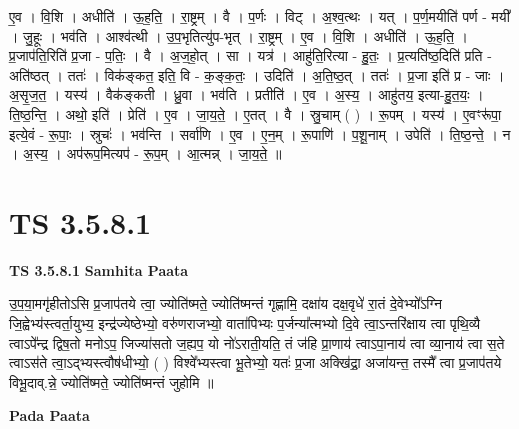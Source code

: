 \documentclass[17pt]{extarticle}
\begin{document}
ए॒व । वि॒शि । अधीति॑ । ऊ॒ह॒ति॒ । रा॒ष्ट्रम् । वै । प॒र्णः । विट् । अ॒श्व॒त्थः । यत् । प॒र्ण॒मयीति॑ पर्ण - मयी᳚ । जु॒हूः । भव॑ति । आश्व॑त्थी । उ॒प॒भृतित्यु॑प-भृत् । रा॒ष्ट्रम् । ए॒व । वि॒शि । अधीति॑ । ऊ॒ह॒ति॒ । प्र॒जाप॑ति॒रिति॑ प्र॒जा - प॒तिः॒ । वै । अ॒ज॒हो॒त् । सा । यत्र॑ । आहु॑ति॒रित्या - हु॒तः॒ । प्र॒त्यति॑ष्ठ॒दिति॑ प्रति - अति॑ष्ठत् । ततः॑ । विक॑ङ्कत॒ इति॒ वि - क॒ङ्क॒तः॒ । उदिति॑ । अ॒ति॒ष्ठ॒त् । ततः॑ । प्र॒जा इति॑ प्र - जाः । अ॒सृ॒ज॒त॒ । यस्य॑ । वैक॑ङ्कती । ध्रु॒वा । भव॑ति । प्रतीति॑ । ए॒व । अ॒स्य॒ । आहु॑तय॒ इत्या-हु॒त॒यः॒ । ति॒ष्ठ॒न्ति॒ । अथो॒ इति॑ । प्रेति॑ । ए॒व । जा॒य॒ते॒ । ए॒तत् । वै । स्रु॒चाम् ( ) । रू॒पम् । यस्य॑ । ए॒वꣳरू॑पा॒ इत्ये॒वं - रू॒पाः॒ । स्रुचः॑ । भव॑न्ति । सर्वा॑णि । ए॒व । ए॒न॒म् । रू॒पाणि॑ । प॒शू॒नाम् । उपेति॑ । ति॒ष्ठ॒न्ते॒ । न । अ॒स्य॒ । अप॑रूप॒मित्यप॑ - रू॒प॒म् । आ॒त्मन्न् । जा॒य॒ते॒ ॥  \newline





\section{ TS 3.5.8.1 }

\textbf{TS 3.5.8.1 } \newline
\textbf{Samhita Paata} \newline

उ॒प॒या॒मगृ॑हीतोऽसि प्र॒जाप॑तये त्वा॒ ज्योति॑ष्मते॒ ज्योति॑ष्मन्तं गृह्णामि॒ दक्षा॑य दक्ष॒वृधे॑ रा॒तं दे॒वेभ्यो᳚ऽग्नि जि॒ह्वेभ्य॑स्त्वर्ता॒युभ्य॒ इन्द्र॑ज्येष्ठेभ्यो॒ वरु॑णराजभ्यो॒ वाता॑पिभ्यः प॒र्जन्या᳚त्मभ्यो दि॒वे त्वा॒ऽन्तरि॑क्षाय त्वा पृथि॒व्यै त्वाऽपे᳚न्द्र द्विष॒तो मनोऽप॒ जिज्या॑सतो ज॒ह्यप॒ यो नो॑ऽराती॒यति॒ तं ज॑हि प्रा॒णाय॑ त्वाऽपा॒नाय॑ त्वा व्या॒नाय॑ त्वा स॒ते त्वाऽस॑ते त्वा॒ऽद्भ्यस्त्वौष॑धीभ्यो॒ ( ) विश्वे᳚भ्यस्त्वा भू॒तेभ्यो॒ यतः॑ प्र॒जा अक्खि॑द्रा॒ अजा॑यन्त॒ तस्मै᳚ त्वा प्र॒जाप॑तये विभू॒दाव्.न्ने॒ ज्योति॑ष्मते॒ ज्योति॑ष्मन्तं जुहोमि ॥ \newline

\textbf{Pada Paata} \newline
\end{document}
